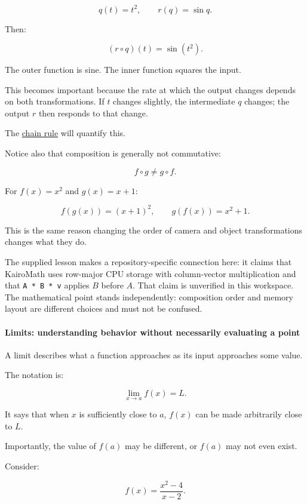 \[
q(t)=t^2,\qquad r(q)=\sin q.
\]

Then:

\[
(r\circ q)(t)=\sin(t^2).
\]

The outer function is sine. The inner function squares the input.

This becomes important because the rate at which the output changes depends on both transformations. If \(t\) changes slightly, the intermediate \(q\) changes; the output \(r\) then responds to that change.

The \hyperref[01-foundations-i-ch020-functions-limits-continuity-and-scalar-change]{chain rule} will quantify this.

Notice also that composition is generally not commutative:

\[
f\circ g\ne g\circ f.
\]

For \(f(x)=x^2\) and \(g(x)=x+1\):

\[
f(g(x))=(x+1)^2, \qquad g(f(x))=x^2+1.
\]

This is the same reason changing the order of camera and object transformations changes what they do.

The supplied lesson makes a repository-specific connection here: it claims that KairoMath uses row-major CPU storage with column-vector multiplication and that \texttt{A\ *\ B\ *\ v} applies \(B\) before \(A\). That claim is unverified in this workspace. The mathematical point stands independently: composition order and memory layout are different choices and must not be confused.

\paragraph{Limits: understanding behavior without necessarily evaluating a point}\label{01-foundations-i-ch020-limits-understanding-behavior-without-necessarily-evaluating-a-point}

A limit describes what a function approaches as its input approaches some value.

The notation is:

\[
\lim_{x\to a}f(x)=L.
\]

It says that when \(x\) is sufficiently close to \(a\), \(f(x)\) can be made arbitrarily close to \(L\).

Importantly, the value of \(f(a)\) may be different, or \(f(a)\) may not even exist.

Consider:

\[
f(x)=\frac{x^2-4}{x-2}.
\]

